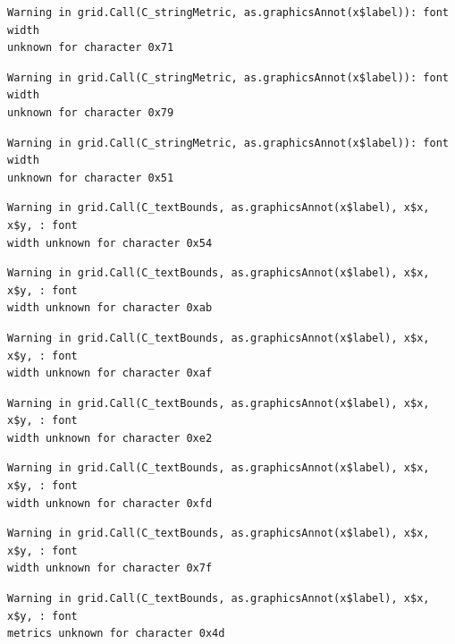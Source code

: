\documentclass[
  letterpaper,
  DIV=11,
  numbers=noendperiod]{scrreprt}
\begin{document}
\begin{verbatim}
Warning in grid.Call(C_stringMetric, as.graphicsAnnot(x$label)): font width
unknown for character 0x71
\end{verbatim}

\begin{verbatim}
Warning in grid.Call(C_stringMetric, as.graphicsAnnot(x$label)): font width
unknown for character 0x79
\end{verbatim}

\begin{verbatim}
Warning in grid.Call(C_stringMetric, as.graphicsAnnot(x$label)): font width
unknown for character 0x51
\end{verbatim}

\begin{verbatim}
Warning in grid.Call(C_textBounds, as.graphicsAnnot(x$label), x$x, x$y, : font
width unknown for character 0x54
\end{verbatim}

\begin{verbatim}
Warning in grid.Call(C_textBounds, as.graphicsAnnot(x$label), x$x, x$y, : font
width unknown for character 0xab
\end{verbatim}

\begin{verbatim}
Warning in grid.Call(C_textBounds, as.graphicsAnnot(x$label), x$x, x$y, : font
width unknown for character 0xaf
\end{verbatim}

\begin{verbatim}
Warning in grid.Call(C_textBounds, as.graphicsAnnot(x$label), x$x, x$y, : font
width unknown for character 0xe2
\end{verbatim}

\begin{verbatim}
Warning in grid.Call(C_textBounds, as.graphicsAnnot(x$label), x$x, x$y, : font
width unknown for character 0xfd
\end{verbatim}

\begin{verbatim}
Warning in grid.Call(C_textBounds, as.graphicsAnnot(x$label), x$x, x$y, : font
width unknown for character 0x7f
\end{verbatim}

\begin{verbatim}
Warning in grid.Call(C_textBounds, as.graphicsAnnot(x$label), x$x, x$y, : font
metrics unknown for character 0x4d
\end{verbatim}
\end{document}
